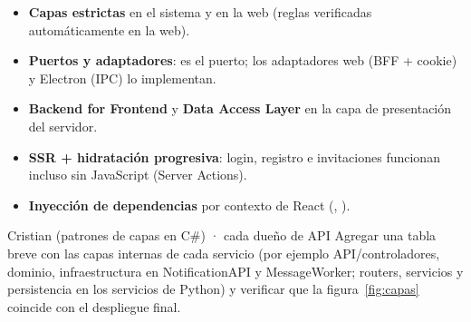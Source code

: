 \begin{itemize}
  \item \textbf{Capas estrictas} en el sistema y en la web (reglas verificadas automáticamente en la web).
  \item \textbf{Puertos y adaptadores}:  es el puerto; los adaptadores web (BFF + cookie) y Electron (IPC) lo implementan.
  \item \textbf{Backend for Frontend} y \textbf{Data Access Layer} en la capa de presentación del servidor.
  \item \textbf{SSR + hidratación progresiva}: login, registro e invitaciones funcionan incluso sin JavaScript (Server Actions).
  \item \textbf{Inyección de dependencias} por contexto de React (, ).
\end{itemize}

\begin{pendiente}{Cristian (patrones de capas en C\#) · cada dueño de API}
Agregar una tabla breve con las capas internas de cada servicio (por ejemplo API/controladores,
dominio, infraestructura en NotificationAPI y MessageWorker; routers, servicios y persistencia en
los servicios de Python) y verificar que la figura~\ref{fig:capas} coincide con el despliegue final.
\end{pendiente}
